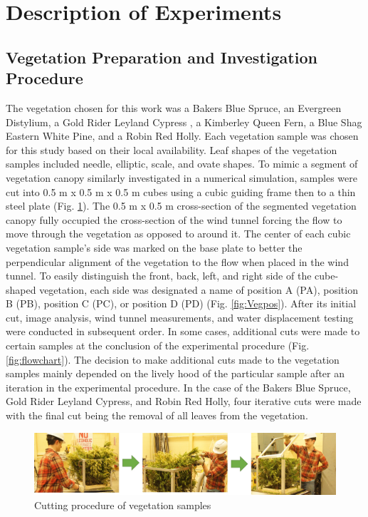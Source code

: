 \documentclass[12pt]{article}
\begin{document}
\section{Description of Experiments}
\label{sec:Experiments}
\subsection{Vegetation Preparation and Investigation Procedure}
\label{ssec:headingscap}
The vegetation chosen for this work was a Bakers Blue Spruce, an Evergreen Distylium, a Gold Rider Leyland Cypress , a Kimberley Queen Fern, a Blue Shag Eastern White Pine, and a Robin Red Holly. Each vegetation sample was chosen for this study based on their local availability. Leaf shapes of the vegetation samples included needle, elliptic, scale, and ovate shapes. 
\indent To mimic a segment of vegetation canopy similarly investigated in a numerical simulation, samples were cut  into 0.5 m x 0.5 m x 0.5 m cubes using a cubic guiding frame then to a thin steel plate (Fig. \ref{fig:Sampleprep}). The 0.5 m x 0.5 m cross-section of the segmented vegetation canopy fully occupied the cross-section of the wind tunnel forcing the flow to move through the vegetation as opposed to around it. The center of each cubic vegetation sample's side was marked on the base plate to better the perpendicular alignment of the vegetation to the flow when placed in the wind tunnel. To easily distinguish the front, back, left, and right side of the cube-shaped vegetation, each side was designated a name of position A (PA), position B (PB), position C (PC), or position D (PD) (Fig. \ref{fig:Vegpos}). After its initial cut, image analysis, wind tunnel measurements, and water displacement testing were conducted in subsequent order. In some cases, additional cuts were made to certain samples at the conclusion of the experimental procedure (Fig. \ref{fig:flowchart}). The decision to make additional cuts made to the vegetation samples mainly depended on the lively hood of the particular sample after an iteration in the experimental procedure. In the case of the Bakers Blue Spruce, Gold Rider Leyland Cypress, and Robin Red Holly, four iterative cuts were made with the final cut being the removal of all leaves from the vegetation.\\

\begin{figure} [h]
	\centering 	\includegraphics[width=1.0\linewidth]{Picture2.jpg}
	\caption{Cutting procedure of vegetation samples}
	\label{fig:Sampleprep}
\end{figure}
\end{document}

